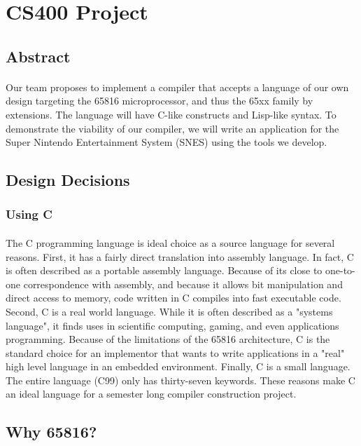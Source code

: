 \documentclass {article}
\begin{document}
\section {CS400 Project}
\subsection{Abstract}

\paragraph{}
Our team proposes to implement a compiler that accepts a language of
our own design targeting the 65816 microprocessor, and thus the 65xx
family by extensions.  The language will have C-like constructs and
Lisp-like syntax.  To demonstrate the viability of our compiler, we
will write an application for the Super Nintendo Entertainment System
(SNES) using the tools we develop.

\subsection{Design Decisions}
\subsubsection{Using C}

\paragraph{}
The C programming language is ideal choice as a source language for
several reasons.  First, it has a fairly direct translation into
assembly language.  In fact, C is often described as a portable
assembly language.  Because of its close to one-to-one correspondence
with assembly, and because it allows bit manipulation and direct
access to memory, code written in C compiles into fast executable
code.  Second, C is a real world language.  While it is often
described as a "systems language", it finds uses in scientific
computing, gaming, and even applications programming. Because of the
limitations of the 65816 architecture, C is the standard choice for an
implementor that wants to write applications in a "real" high level
language in an embedded environment. Finally, C is a small language.
The entire language (C99) only has thirty-seven keywords.  These
reasons make C an ideal language for a semester long compiler
construction project.

\subsection{Why 65816?}
\end{document}
